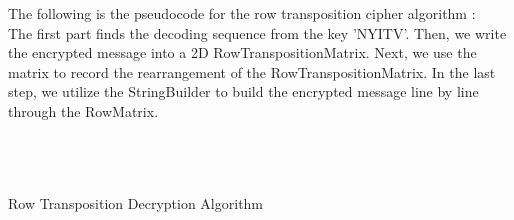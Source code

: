 \documentclass[twoside,twocolumn]{article}
\begin{document}
The following is the pseudocode for the row transposition cipher algorithm : \\ 
\indent The first part finds the decoding sequence from the key 'NYITV'. Then, we write the encrypted message into a 2D RowTranspositionMatrix. Next, we use the matrix to record the rearrangement of the RowTranspositionMatrix. In the last step, we utilize the StringBuilder to build the encrypted message line by line through the RowMatrix.\\ \\ \\ \\ 


\vspace*{-1.5cm}

 {\footnotesize Row Transposition Decryption Algorithm}
\renewcommand {\algorithmicrequire}{\textbf{input:}}
\renewcommand{\algorithmicensure}{\textbf{output:}}
\end{document}
